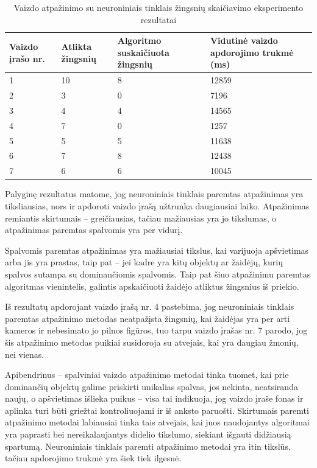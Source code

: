 \documentclass{VUMIFPSbakalaurinis}
\begin{document}
\begin{table}[H]\footnotesize
	\centering
	\caption{Vaizdo atpažinimo su neuroniniais tinklais žingsnių skaičiavimo eksperimento rezultatai}
	{\begin{tabular}{|p{3cm}|p{3cm}|p{3cm}|p{3cm}|} \hline
			\textbf{Vaizdo įrašo nr.} & \textbf{Atlikta žingsnių} & \textbf{Algoritmo suskaičiuota žingsnių} & \textbf{Vidutinė vaizdo apdorojimo trukmė (ms)} \\
			\hline
			1  & 10    & 8    & 12859    \\
			\hline
			2  & 3    & 0  & 7196     \\
			\hline
			3  & 4    & 4   & 14565    \\
			\hline
			4  & 7    & 0  & 1257     \\
			\hline
			5  & 5    & 5  & 11638     \\
			\hline
			6  & 7    & 8  & 12438     \\
			\hline
			7  & 6    & 6  & 10045     \\
			\hline
	\end{tabular}}
	\label{tab:poseresults}
\end{table}

Palyginę rezultatus matome, jog neuroniniais tinklais paremtas atpažinimas yra tiksliausias, nors ir apdoroti vaizdo įrašą užtrunka daugiausiai laiko. Atpažinimas remiantis skirtumais – greičiausias, tačiau mažiausias yra jo tikslumas, o atpažinimas paremtas spalvomis yra per vidurį. 

Spalvomis paremtas atpažinimas yra mažiausiai tikslus, kai varijuoja apšvietimas arba jis yra prastas, taip pat – jei kadre yra kitų objektų ar žaidėjų, kurių spalvos sutampa su dominančiomis spalvomis. Taip pat šiuo atpažinimu paremtas algoritmas vienintelis, galintis apskaičiuoti žaidėjo atliktus žingsnius iš priekio. 

Iš rezultatų apdorojant vaizdo įrašą nr. 4 pastebima, jog neuroniniais tinklais paremtas atpažinimo metodas neatpažįsta žingsnių, kai žaidėjas yra per arti kameros ir nebesimato jo pilnos figūros, tuo tarpu vaizdo įrašas nr. 7 parodo, jog šis atpažinimo metodas puikiai susidoroja su atvejais, kai yra daugiau žmonių, nei vienas. 

Apibendrinus – spalviniai vaizdo atpažinimo metodai tinka tuomet, kai prie dominančių objektų galime priskirti unikalias spalvas, jos nekinta, neatsiranda naujų, o apšvietimas išlieka puikus – visa tai indikuoja, jog vaizdo įraše fonas ir aplinka turi būti griežtai kontroliuojami ir iš anksto paruošti. Skirtumais paremti atpažinimo metodai labiausiai tinka tais atvejais, kai juos naudojantys algoritmai yra paprasti bei nereikalaujantys didelio tikslumo, siekiant išgauti didžiausią spartumą. Neuroniniais tinklais paremti atpažinimo metodai yra itin tikslūs, tačiau apdorojimo trukmė yra šiek tiek ilgesnė.
\end{document}

